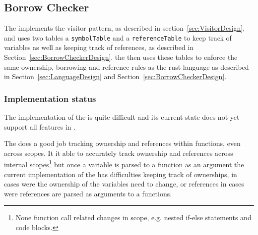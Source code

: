 \subsection{Borrow Checker}
\label{sec:BorrowCheckerImpl}

The \borrowChecker{} implements the visitor pattern, as described in
section~\ref{sec:VisitorDesign}, and uses two tables a
\texttt{symbolTable} and a \texttt{referenceTable} to keep track of variables as well
as keeping track of references, as described in
Section~\ref{sec:BorrowCheckerDesign}. the \borrowChecker{} then uses these tables to enforce the
same ownership, borrowing and reference rules as the rust language as described
in Section~\ref{sec:LanguageDesign} and Section~\ref{sec:BorrowCheckerDesign}. 

\subsubsection{Implementation status}

The implementation of the \borrowChecker{} is quite difficult and its current state
does not yet support all features in \lang{}. 

The \borrowChecker{} does a good job tracking ownership and references within
functions, even across scopes. It it able to accurately track ownership and
references across internal scopes\footnote{None function call related changes in
scope, e.g. nested if-else statements and code blocks.} but once a variable is parsed
to a function as an argument the current implementation of the \borrowChecker{} has
difficulties keeping track of ownerships, in cases were the ownership of the
variables need to change, or references in cases were references are parsed as
arguments to a functions.


